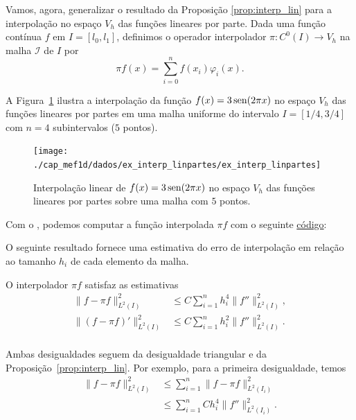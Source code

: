 Vamos, agora, generalizar o resultado da Proposição \ref{prop:interp_lin} para a interpolação no espaço $V_h$ das funções lineares por parte. Dada uma função contínua $f$ em $I = [l_0, l_1]$, definimos o operador interpolador $\pi: C^0(I)\to V_h$ na malha $\mathcal{I}$ de $I$ por
\begin{equation}
  \pi f(x) = \sum_{i=0}^{n}f(x_i)\varphi_i(x).
\end{equation}

\begin{ex}\label{ex:interp_linpartes}
  A Figura~\ref{fig:ex_interp_linpartes} ilustra a interpolação da função $f(x)=3\operatorname{sen}(2\pi x)$ no espaço $V_h$ das funções lineares por partes em uma malha uniforme do intervalo $I=[1/4, 3/4]$ com $n=4$ subintervalos ($5$ pontos). 

  \begin{figure}[h!]
    \centering
    \texttt{[image: ./cap\_mef1d/dados/ex\_interp\_linpartes/ex\_interp\_linpartes]}
    \caption{Interpolação linear de $f(x)=3\operatorname{sen}(2\pi x)$ no espaço $V_h$ das funções lineares por partes sobre uma malha com $5$ pontos.}
    \label{fig:ex_interp_linpartes}
  \end{figure}

\ifispython
Com o \fenics, podemos computar a função interpolada $\pi f$ com o seguinte \href{https://github.com/phkonzen/notas/blob/master/src/MetodoElementosFinitos/cap_mef1d/dados/ex_interp_linpartes/ex_interp_linpartes.py}{código}:

\fi
\end{ex}

O seguinte resultado fornece uma estimativa do erro de interpolação em relação ao tamanho $h_i$ de cada elemento da malha.

\begin{prop}\label{prop:interp_linpartes}
  O interpolador $\pi f$ satisfaz as estimativas
  \begin{align}
    \|f-\pi f\|_{L^2(I)}^2 &\leq C\sum_{i=1}^n h_i^4\|f''\|_{L^2(I)}^2,\\
    \|(f-\pi f)'\|_{L^2(I)}^2 &\leq C\sum_{i=1}^n h_i^2\|f''\|_{L^2(I)}^2.\\
  \end{align}
\end{prop}
\begin{dem}
  Ambas desigualdades seguem da desigualdade triangular e da Proposição~\ref{prop:interp_lin}. Por exemplo, para a primeira desigualdade, temos
  \begin{align}
    \|f - \pi f\|_{L^2(I)}^2 &\leq \sum_{i=1}^n \|f - \pi f\|_{L^2(I_i)}^2\\
    &\leq \sum_{i=1}^n Ch_i^4 \|f''\|_{L^2(I_i)}^2.
  \end{align}
\end{dem}

